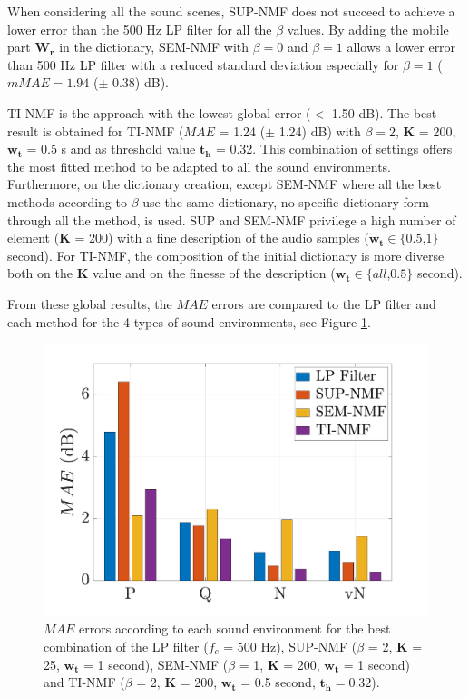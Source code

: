 \documentclass[review,5p,twocolumn,sort&compress,times]{elsarticle}
\begin{document}
When considering all the sound scenes, SUP-NMF does not succeed to achieve a lower error than the 500 Hz LP filter for all the $\beta$ values. By adding the mobile part $\mathbf{W_r}$ in the dictionary, SEM-NMF with $\beta = 0$ and $\beta = 1$ allows a lower error than 500 Hz LP filter with a reduced standard deviation especially for $\beta = 1$ ($mMAE = 1.94$ ($\pm$ 0.38) dB).

TI-NMF is the approach with the lowest global error ($<$ 1.50 dB). The best result is obtained for TI-NMF ($MAE$ = 1.24 ($\pm$ 1.24) dB) with $\beta = 2$, $\mathbf{K}$ = 200, $\mathbf{w_t}$ = 0.5 s and as threshold value $\mathbf{t_h}$ = 0.32. This combination of settings offers the most fitted method to be adapted to all the sound environments.
Furthermore, on the dictionary creation, except SEM-NMF where all the best methods according to $\beta$ use the same dictionary, no specific dictionary form through all the method, is used. SUP and SEM-NMF privilege a high number of element ($\mathbf{K}$ = 200) with a fine description of the audio samples ($\mathbf{w_t} \in \lbrace 0.5$,$1 \rbrace$ second). For TI-NMF, the composition of the initial dictionary is more diverse both on the $\mathbf{K}$ value and on the finesse  of the description ($\mathbf{w_t} \in \lbrace all$,$0.5 \rbrace$ second).

From these global results, the $MAE$ errors are compared to the LP filter and each method for the 4 types of sound environments, see Figure \ref{fig:mae_env}.

\begin{figure}[t]
\centering
\includegraphics[width=\linewidth]{figures/mea_grafic_bar.pdf}
\caption{$MAE$ errors according to each sound environment for the best combination of the LP filter ($f_c$ = 500 Hz), SUP-NMF ($\beta$ = 2, $\mathbf{K}$ = 25, $\mathbf{w_t}$ = 1 second), SEM-NMF ($\beta$ = 1, $\mathbf{K}$ = 200, $\mathbf{w_t}$ = 1 second) and TI-NMF ($\beta$ = 2, $\mathbf{K}$ = 200, $\mathbf{w_t}$ = 0.5 second, $\mathbf{t_{h}} = 0.32$).}
\label{fig:mae_env}
\end{figure}
\end{document}
